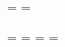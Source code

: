 \newtoks\oddhead
\newtoks\evenhead
\newtoks\titlehead
\oddhead={\rlap{\RHoddleft}\hfil\RHoddcenter\hfil\llap{\RHoddright}}
\evenhead={\rlap{\RHevenleft}\hfil\RHevencenter\hfil\llap{\RHevenright}}
\titlehead={\rlap{\RHtitleleft}\hfil\RHtitlecenter\hfil\llap{\RHtitleright}}

\footline={{%
 \edef\t@st{\p@gefirstmark}%
 \ifx\t@st\empty \hfil \else
  \ifx\t@st\t@tle \the\titlefoot \else
  \ifodd\pageno \the\oddfoot \else 
    \ifDoubleSided \the\evenfoot \else \the\oddfoot \fi
  \fi\fi\fi}}
\newtoks\oddfoot
\newtoks\evenfoot
\newtoks\titlefoot
\oddfoot={\rlap{\RFoddleft}\hfil\RFoddcenter\hfil\llap{\RFoddright}}
\evenfoot={\rlap{\RFevenleft}\hfil\RFevencenter\hfil\llap{\RFevenright}}
\titlefoot={\rlap{\RFtitleleft}\hfil\RFtitlecenter\hfil\llap{\RFtitleright}}

%
%
\def\firstref{\ifRTL\beginR\fi\f@rstref{\p@gefirstmark}\ifRTL\endR\fi}
\def\lastref{\ifRTL\beginR\fi\l@stref{\p@gebotmark}\ifRTL\endR\fi}
\def\rangeref{\ifRTL\beginR\fi\r@ngerefs{\p@gefirstmark}{\p@gebotmark}\ifRTL\endR\fi}
\let\pagenumber=\folio

%
%
\def\RHoddleft{\empty}
\def\RHoddcenter{\rangeref}
\def\RHoddright{\pagenumber}

\def\RHevenleft{\pagenumber}
\def\RHevencenter{\rangeref}
\def\RHevenright{\empty}

\def\RHtitleleft{\empty}
\def\RHtitlecenter{\empty}
\def\RHtitleright{\empty}

\def\RFoddleft{\empty}
\def\RFoddcenter{\empty}
\def\RFoddright{\empty}

\def\RFevenleft{\empty}
\def\RFevencenter{\empty}
\def\RFevenright{\empty}

\def\RFtitleleft{\empty}
\def\RFtitlecenter{\pagenumber}
\def\RFtitleright{\empty}

\endinput
